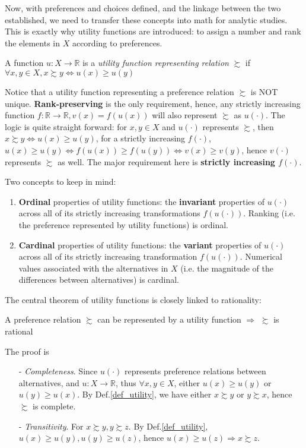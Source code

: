 Now, with preferences and choices defined, and the linkage between the two established, we need to transfer these concepts into math for analytic studies.
This is exactly why utility functions are introduced: to assign a number and rank the elements in $X$ according to preferences.

\begin{definition}\label{def_utility}
    A function $u:X\rightarrow\mathbb{R}$ is a \textit{utility function representing relation} $\succsim$ if $\forall x,y\in X,x\succsim y\Leftrightarrow u(x)\geq u(y)$
\end{definition}

Notice that a utility function representing a preference relation $\succsim$ is NOT unique. \textbf{Rank-preserving} is the only requirement, hence, any 
strictly increasing function $f:\mathbb{R}\rightarrow\mathbb{R},v(x)=f(u(x))$ will also represent $\succsim$ as $u(\cdot)$. The logic is quite straight forward: for $x,y\in X$ and $u(\cdot)$ represents $\succsim$, then $x\succsim y \Leftrightarrow u(x)\geq u(y)$, for a strictly increasing $f(\cdot)$, $u(x)\geq u(y)\Leftrightarrow f(u(x))\geq f(u(y))\Leftrightarrow v(x)\geq v(y)$, hence $v(\cdot)$ represents $\succsim$ as well.
The major requirement here is \textbf{strictly increasing $f(\cdot)$}.

Two concepts to keep in mind:
\begin{enumerate}
    \item \textbf{Ordinal} properties of utility functions: the \textbf{invariant} properties of $u(\cdot)$ across all of its strictly increasing transformations $f(u(\cdot))$. Ranking (i.e. the preference represented by utility functions) is ordinal.
    \item \textbf{Cardinal} properties of utility functions: the \textbf{variant} properties of $u(\cdot)$ across all of its strictly increasing transformation $f(u(\cdot))$. Numerical values associated with the alternatives in $X$ (i.e. the magnitude of the differences between alternatives) is cardinal.
\end{enumerate}

The central theorem of utility functions is closely linked to rationality:
\begin{theorem}\label{thm_utility_is_rational}
    A preference relation $\succsim$ can be represented by a utility function $\Rightarrow$ $\succsim$ is rational
\end{theorem}

The proof is
\begin{enumerate}
    \item[-] \textit{Completeness}. Since $u(\cdot)$ represents preference relations between alternatives, and $u:X\rightarrow\mathbb{R}$, thus $\forall x,y\in X$, either $u(x)\geq u(y)$ or $u(y) \geq u(x)$. By Def.\ref{def_utility}, we have either $x\succsim y$ or $y\succsim x$, hence $\succsim$ is complete.
    \item[-] \textit{Transitivity}. For $x\succsim y,y\succsim z$. By Def.\ref{def_utility}, $u(x)\geq u(y),u(y)\geq u(z)$, hence $u(x)\geq u(z)\Rightarrow x\succsim z$.
\end{enumerate}

